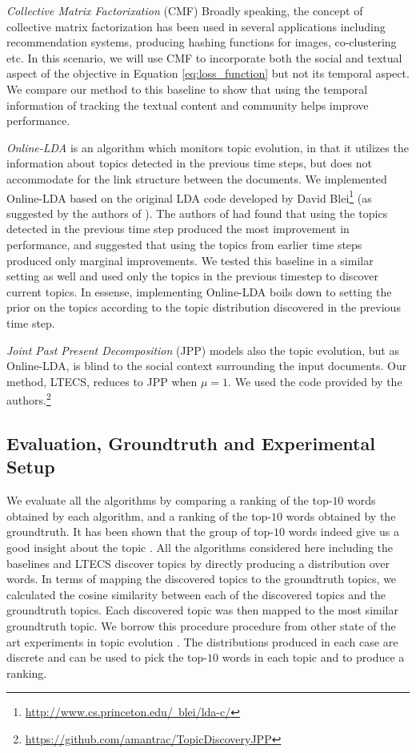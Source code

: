 \emph{Collective Matrix Factorixation} (CMF) \cite{Saveski:2014, Ding:2014} 
Broadly speaking, the concept of collective matrix factorization has been
used in several applications including recommendation systems, producing hashing functions for images, co-clustering etc.
In this scenario, we will use CMF to incorporate both the social and textual aspect
of the objective in Equation \ref{eq:loss_function} but not its temporal aspect.
We compare our method to this
baseline to show that using the temporal information of tracking the textual content and community helps improve
performance.

\emph{Online-LDA} \cite{AlSumait:2008} is an algorithm which monitors topic evolution, in that it utilizes 
the information about topics detected in the previous time steps, but does not accommodate 
for the link structure between the documents.  We implemented Online-LDA based
on the original LDA code developed by David Blei\footnote{\hyperref[]{http://www.cs.princeton.edu/~blei/lda-c/}} 
(as suggested by the authors of \cite{AlSumait:2008}).  The authors
of \cite{AlSumait:2008} had found that using the topics detected in the previous time step produced the most improvement in
performance, and suggested that using the topics from earlier time steps produced only marginal improvements.  
We tested this baseline in a similar setting as well and used only the topics in the previous timestep to discover current topics.
In essense, implementing Online-LDA boils down to setting the prior on the topics according to the topic
distribution discovered in the previous time step.

\emph{Joint Past Present Decomposition} (JPP) \cite{Vaca:2014} models also the topic evolution, but as Online-LDA, is blind to the social context surrounding the  input documents.  Our method, LTECS, reduces to JPP when $\mu = 1$.
We used the code provided by the authors.\footnote{\hyperref[]{https://github.com/amantrac/TopicDiscoveryJPP}}
\subsection{Evaluation, Groundtruth and Experimental Setup}
\label{subsec:ground_truth_evaluation}
We evaluate all the algorithms by comparing a ranking of the top-$10$ words obtained by each
algorithm, and a ranking of the top-$10$ words obtained by the groundtruth.  It has been shown that
the group of top-$10$ words indeed give us a good insight about the topic \cite{sekiguchi:2006,newman2010automatic}.
All the algorithms considered here including the baselines and LTECS
discover topics by directly producing a distribution over words. 
In terms of mapping the discovered topics to the groundtruth topics, we calculated
the cosine similarity between each of the discovered topics and the groundtruth topics.
Each discovered topic was then mapped to the most similar groundtruth topic.
We borrow this procedure procedure from other state of the art experiments
in topic evolution \cite{Saha:2012}.
The distributions produced in each case are discrete and can be used 
to pick the top-$10$ words in each topic and to produce a ranking.

